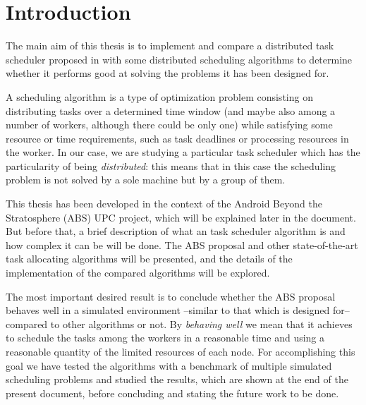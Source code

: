 
\chapter{Introduction} %

\label{Chapter1} %


\newcommand{\keyword}[1]{\textbf{#1}}
\newcommand{\tabhead}[1]{\textbf{#1}}
\newcommand{\code}[1]{\texttt{#1}}
\newcommand{\file}[1]{\texttt{\bfseries#1}}
\newcommand{\option}[1]{\texttt{\itshape#1}}

The main aim of this thesis is to implement and compare a distributed task scheduler proposed in \cite{Araguz15} with some distributed scheduling algorithms to determine whether it performs good at solving the problems it has been designed for. %

A scheduling algorithm is a type of optimization problem consisting on distributing tasks over a determined time window (and maybe also among a number of workers, although there could be only one) while satisfying some resource or time requirements, such as task deadlines or processing resources in the worker. In our case, we are studying a particular task scheduler which has the particularity of being \emph{distributed}: this means that in this case the scheduling problem is not solved by a sole machine but by a group of them.

This thesis has been developed in the context of the Android Beyond the Stratosphere (ABS) UPC project, which will be explained later in the document. But before that, a brief description of what an task scheduler algorithm is and how complex  it can be will be done. The ABS proposal and other state-of-the-art task allocating algorithms will be presented, %
and the details of the implementation of the compared algorithms will be explored.

The most important desired result is to conclude whether the ABS proposal behaves well in a simulated environment --similar to that which is designed for-- compared to other algorithms or not.%
By \emph{behaving well} we mean that it achieves to schedule the tasks among the workers in a reasonable time and using a reasonable quantity of the limited resources of each node. For accomplishing this goal we have tested the algorithms with a benchmark of multiple simulated scheduling problems and studied the results, which are shown at the end of the present document, before concluding and stating the future work to be done.

